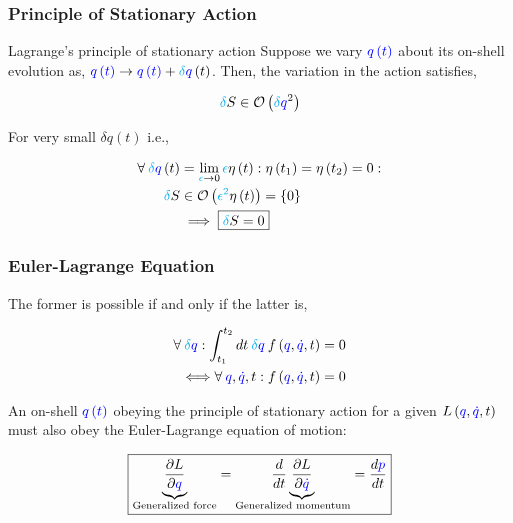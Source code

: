 \documentclass{beamer}
\begin{document}
\begin{frame}
\frametitle{Principle of Stationary Action}

\begin{block}{Lagrange's principle of stationary action}
Suppose we vary $\textcolor{blue}{q \left( t \right)}$ about its on-shell evolution as, $\textcolor{blue}{q \left( t \right)} \to \textcolor{blue}{q \left( t \right)} + \textcolor{cyan}{\delta} \textcolor{blue}{q} \left( t \right)$. Then, the variation in the action satisfies,

$$\textcolor{cyan}{\delta} S \in \mathcal{O} \left( \textcolor{cyan}{\delta} \textcolor{blue}{q}^2  \right)$$
\end{block}

\begin{corollary}
For very small $\delta q \left( t \right)$ i.e.,

\begin{align*}
\forall \: \textcolor{cyan}{\delta} \textcolor{blue}{q} \left( t \right) & = \lim_{\textcolor{cyan}{\epsilon} \to 0} \textcolor{cyan}{\epsilon} \eta \left( t \right) : \eta \left( t_1 \right) = \eta \left( t_2 \right) = 0 : \\
\textcolor{cyan}{\delta} S & \in \mathcal{O} \left( \textcolor{cyan}{\epsilon^2} \eta \left( t \right) \right) = \left\{ 0 \right\} \\
& \implies \boxed{\textcolor{cyan}{\delta} S = 0}
\end{align*}
\end{corollary}
\end{frame}

\begin{frame}
\frametitle{Euler-Lagrange Equation}

\begin{lemma}
The former is possible if and only if the latter is,

\begin{align}
\forall \: \textcolor{cyan}{\delta} \textcolor{blue}{q} : \int_{t_1}^{t_2} dt \: \textcolor{cyan}{\delta} \textcolor{blue}{q} \: f \left( \textcolor{blue}{q}, \textcolor{blue}{\dot{q}}, t \right) & = 0 \\
\Longleftrightarrow \forall \: \textcolor{blue}{q}, \textcolor{blue}{\dot{q}}, t : f \left( \textcolor{blue}{q}, \textcolor{blue}{\dot{q}}, t \right) & = 0
\end{align}
\end{lemma}

\begin{theorem}
An on-shell $\textcolor{blue}{q \left( t \right)}$ obeying the principle of stationary action for a given $L \left( \textcolor{blue}{q}, \textcolor{blue}{\dot{q}}, t \right)$ must also obey the Euler-Lagrange equation of motion:

$$\boxed{\underset{\text{Generalized force}}{\underbrace{\frac{\partial L}{\partial \textcolor{blue}{q}}}} = \underset{\text{Generalized momentum}}{\frac{d}{dt} \underbrace{\frac{\partial L}{\partial \textcolor{blue}{\dot{q}}}}} = \frac{d \textcolor{blue}{p}}{dt}}$$
\end{theorem}
\end{frame}
\end{document}
